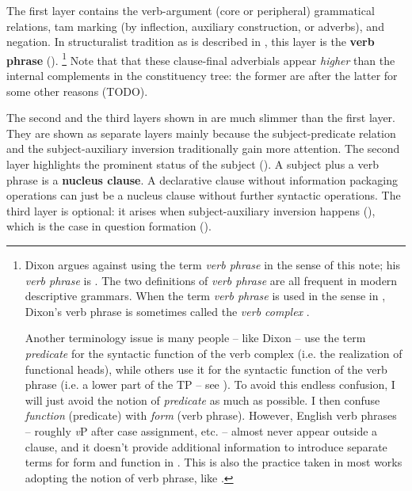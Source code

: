 \documentclass[UTF8, a4paper, oneside, scheme=plain, 12pt]{ctexbook}
\newcommand*{\concept}[1]{\textbf{#1}}
\newcommand*{\term}[1]{\emph{#1}}
\newcommand{\vP}{\textit{v}P}
\begin{document}
The first layer contains the verb-argument (core or peripheral) grammatical relations,
\ac{tam} marking (by inflection, auxiliary construction, or adverbs), and negation.
In structuralist tradition as is described in \citet{cgel},
this layer is the \concept{verb phrase} ().%
\footnote{
    Dixon argues against using the term \term{verb phrase} in the sense of this note;
    his \term{verb phrase} is .
    The two definitions of \term{verb phrase} are all frequent in modern descriptive grammars.
    When the term \term{verb phrase} is used in the sense in ,
    Dixon's verb phrase is sometimes called the \term{verb complex} \citep{Friesen2017}.

    Another terminology issue is many people -- like Dixon -- use the term \term{predicate}
    for the syntactic function of the verb complex
    (i.e. the realization of functional heads),
    while others use it for the syntactic function of the verb phrase 
    (i.e. a lower part of the TP -- see ).
    To avoid this endless confusion, 
    I will just avoid the notion of \term{predicate} as much as possible.
    I then confuse \emph{function} (predicate)
    with \emph{form} (verb phrase).
    However, English verb phrases -- roughly \vP{} after case assignment, etc. -- 
    almost never appear outside a clause,
    and it doesn't provide additional information 
    to introduce separate terms for form and function in .
    This is also the practice taken in most works adopting the notion of verb phrase,
    like \citet{Friesen2017}.
}
Note that that these clause-final adverbials 
appear \emph{higher} than the internal complements 
in the constituency tree:
the former are after the latter for some other reasons (TODO).

The second and the third layers shown in 
are much slimmer than the first layer.
They are shown as separate layers mainly because 
the subject-predicate relation 
and the subject-auxiliary inversion 
traditionally gain more attention.
The second layer highlights the prominent status of the subject ().
A subject plus a verb phrase is a \concept{nucleus clause}.
A declarative clause without information packaging operations
can just be a nucleus clause without further syntactic operations.
The third layer is optional:
it arises when subject-auxiliary inversion happens (),
which is the case in %
question formation ().
\end{document}
